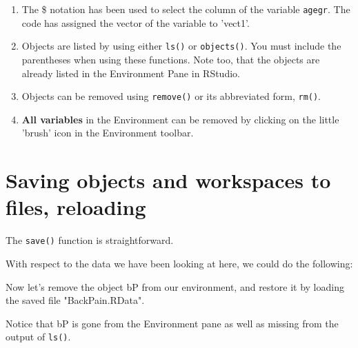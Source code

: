 \documentclass[titlepage]{book}\usepackage{knitr}
\begin{document}
\begin{enumerate}
\item The \$ notation has been used to select the column of the variable \texttt{agegr}. The code has assigned the vector of the variable to 'vect1'.

\item Objects are listed by using either \texttt{ls()} or \texttt{objects()}. You must include the parentheses when using these functions. Note too, that the objects are already listed in the Environment Pane in RStudio.

\item Objects can be removed using \texttt{remove()} or its abbreviated form, \texttt{rm()}.
\item{ \textbf{All variables} in the Environment can be removed by clicking on the little 'brush' icon in the Environment toolbar.}

\end{enumerate}

\section{Saving objects and workspaces to files, reloading}

The \texttt{save()} function is straightforward.

With respect to the data we have been looking at here, we could do the following:
\begin{knitrout}
\color{fgcolor}\begin{kframe}
\begin{alltt}
\hlstd{(}\hlstd{,} \hlstd{=}\hlstd{)}
\hlstd{()}
\end{alltt}
\end{kframe}
\end{knitrout}


Now let's remove the object bP from our environment, and restore it by loading the saved file "BackPain.RData".

\begin{knitrout}
\color{fgcolor}\begin{kframe}
\begin{alltt}
\hlstd{()}
\end{alltt}
\end{kframe}
\end{knitrout}
Notice that bP is gone from the Environment pane as well as missing from the output of \texttt{ls()}.
\end{document}
